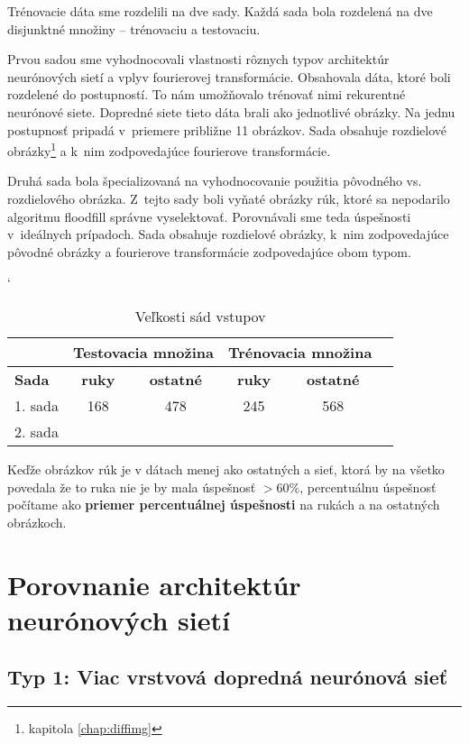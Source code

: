 Trénovacie dáta sme rozdelili na dve sady. Každá sada bola rozdelená na dve disjunktné množiny -- trénovaciu a testovaciu. 

Prvou sadou sme vyhodnocovali vlastnosti rôznych typov architektúr neurónových sietí a vplyv fourierovej transformácie. Obsahovala dáta, ktoré boli rozdelené do postupností. To nám umožňovalo trénovať nimi rekurentné neurónové siete. Dopredné siete tieto dáta brali ako jednotlivé obrázky. Na jednu postupnosť pripadá v~priemere približne 11 obrázkov. Sada obsahuje rozdielové obrázky\footnote{kapitola \ref{chap:diffimg}} a k~nim zodpovedajúce fourierove transformácie.

Druhá sada bola špecializovaná na vyhodnocovanie použitia pôvodného vs. rozdielového obrázka. Z~tejto sady boli vyňaté obrázky rúk, ktoré sa nepodarilo algoritmu floodfill správne vyselektovať. Porovnávali sme teda úspešnosti v~ideálnych prípadoch. Sada obsahuje rozdielové obrázky, k~nim zodpovedajúce pôvodné obrázky a fourierove transformácie zodpovedajúce obom typom.

\begin{table}[h]
\catcode` %
\centering
\begin{tabular}{|l|c|c|c|c|c|}
\cline{2-5}
\multicolumn{1}{l}{} & \multicolumn{2}{|c|}{\textbf{Testovacia množina}} & \multicolumn{2}{c|}{\textbf{Trénovacia množina}}\\ 
\hline
\textbf{Sada} & \textbf{ruky} & \textbf{ostatné} & \textbf{ruky} & \textbf{ostatné} \\ \hline
1. sada & 168 & 478 & 245  & 568 \\ \hline
2. sada & & & & \\ 
\hline
\end{tabular}
\caption{Veľkosti sád vstupov}
\label{tab:neuroncountcmp}
\end{table}

Keďže obrázkov rúk je v dátach menej ako ostatných a sieť, ktorá by na všetko povedala že to ruka nie je by mala úspešnosť $>60\%$, percentuálnu úspešnosť počítame ako \textbf{priemer percentuálnej úspešnosti} na rukách a na ostatných obrázkoch.

\section{Porovnanie architektúr neurónových sietí}

\subsection{Typ 1: Viac vrstvová dopredná neurónová sieť}

